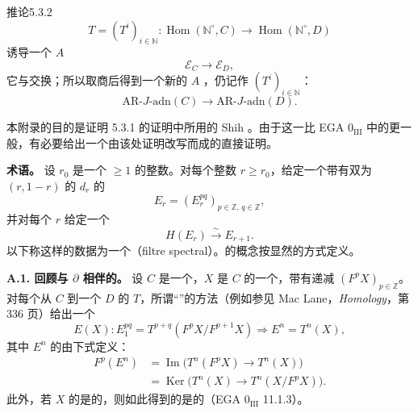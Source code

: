\begin{SGAresult}{推论}{5.3.2}
\[
T=(T^i)_{i\in\mathbb N}:\operatorname{Hom}(\mathbb N^\circ,C)\longrightarrow\operatorname{Hom}(\mathbb N^\circ,D)
\]
诱导一个 $A$ 
\[
\mathscr E_C\longrightarrow\mathscr E_D,
\]
它与交换；所以取商后得到一个新的 $A$ ，仍记作 $(T^i)_{i\in\mathbb N}$：
\[
\mathrm{AR}\text{-}J\text{-}\mathrm{adn}(C)\longrightarrow\mathrm{AR}\text{-}J\text{-}\mathrm{adn}(D).
\]
\end{SGAresult}


本附录的目的是证明 5.3.1 的证明中所用的 Shih 。由于这一比 EGA $0_{\mathrm{III}}$ 中的更一般，有必要给出一个由该处证明改写而成的直接证明。

\textbf{术语。} 设 $r_0$ 是一个 $\geq1$ 的整数。对每个整数 $r\geq r_0$，给定一个带有双为 $(r,1-r)$ 的 $d_r$ 的
\[
E_r=(E_r^{pq})_{p\in\mathbb Z,\,q\in\mathbb Z},
\]
并对每个 $r$ 给定一个
\[
H(E_r)\xrightarrow{\sim}E_{r+1}.
\]
以下称这样的数据为一个（filtre spectral）。的概念按显然的方式定义。

\textbf{A.1. 回顾与 $\partial$ 相伴的。}
设 $C$ 是一个，$X$ 是 $C$ 的一个，带有递减 $(F^pX)_{p\in\mathbb Z}$。对每个从 $C$ 到一个 $D$ 的 $T$，所谓“”的方法（例如参见 Mac Lane，\textit{Homology}，第 336 页）给出一个
\[
E(X):E_1^{pq}=T^{p+q}(F^pX/F^{p+1}X)\Longrightarrow E^n=T^n(X),
\]
其中 $E^n$ 的由下式定义：
\[
\begin{split}
F^p(E^n)&=\operatorname{Im}\bigl(T^n(F^pX)\longrightarrow T^n(X)\bigr)\\
&=\operatorname{Ker}\bigl(T^n(X)\longrightarrow T^n(X/F^pX)\bigr).
\end{split}
\]
此外，若 $X$ 的是的，则如此得到的是的（EGA $0_{\mathrm{III}}$ 11.1.3）。

